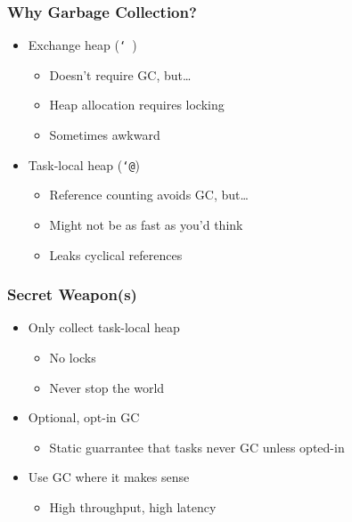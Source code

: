 \documentclass[ignorenonframetext,12pt]{beamer}
\begin{document}
\begin{frame}\frametitle{Why Garbage Collection?}
\large
\begin{itemize}
  \item Exchange heap (\texttt{\char`~})
  \begin{itemize}
    \item Doesn't require GC, but\ldots
    \item Heap allocation requires locking
    \item Sometimes awkward
  \end{itemize}
  \item Task-local heap (\texttt{\char`@})
  \begin{itemize}
    \item Reference counting avoids GC, but\ldots
    \item Might not be as fast as you'd think
    \item Leaks cyclical references
  \end{itemize}
\end{itemize}
\end{frame}

\begin{frame}\frametitle{Secret Weapon(s)}
\large
\begin{itemize}
  \item Only collect task-local heap
  \begin{itemize}
    \item No locks
    \item Never stop the world
  \end{itemize}
  \item Optional, opt-in GC
  \begin{itemize}
    \item Static guarrantee that tasks never GC unless opted-in
  \end{itemize}
  \item Use GC where it makes sense
  \begin{itemize}
    \item High throughput, high latency
  \end{itemize}
\end{itemize}
\end{frame}
\end{document}
